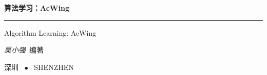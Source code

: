 \begin{titlepage}
    \vspace*{25ex}
  
    \hspace{0.05\textwidth}\begin{minipage}{.9\textwidth}
      \flushright
  
      {\textbf{算法学习：AcWing}}
  
      \rule{\linewidth}{.5pt}
  
      \vspace{2ex}
  
      {\textsf{Algorithm Learning: AcWing}} \\
  
      \vspace{20ex}
  
      {\textit{吴小强}~编著}
    \end{minipage}
  
    \vfill
  
    \centering
    {深圳 ~$\bullet$ ~SHENZHEN}
  \end{titlepage}